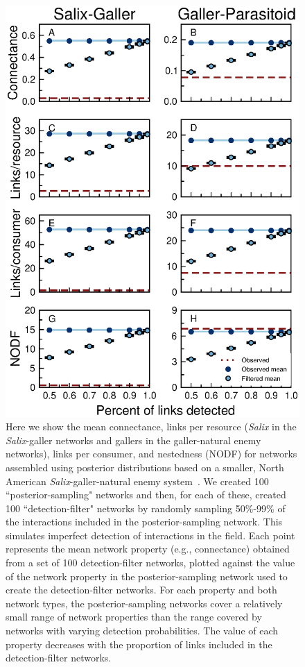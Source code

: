 \documentclass[12pt]{article}
\begin{document}
      \begin{figure}[ht]
      \caption{Here we show the mean connectance, links per resource (\emph{Salix} in the \emph{Salix}-galler networks and gallers in the galler-natural enemy networks), links per consumer, and nestedness (NODF) for networks assembled using posterior distributions based on a smaller, North American \emph{Salix}-galler-natural enemy system~\citep{Barbour2016,Barbour2016Dryad}. We created 100 ``posterior-sampling" networks and then, for each of these, created 100 ``detection-filter" networks by randomly sampling 50\%-99\% of the interactions included in the posterior-sampling network. This simulates imperfect detection of interactions in the field. Each point represents the mean network property (e.g., connectance) obtained from a set of 100 detection-filter networks, plotted against the value of the network property in the posterior-sampling network used to create the detection-filter networks. For each property and both network types, the posterior-sampling networks cover a relatively small range of network properties than the range covered by networks with varying detection probabilities. The value of each property decreases with the proportion of links included in the detection-filter networks.}
      \label{posterior_webs}    
      \begin{center}
      \includegraphics[width=.6\textwidth]{Figures/Salix_Galler_posterior_properties.eps}
      \end{center}
      \end{figure}
\end{document}
